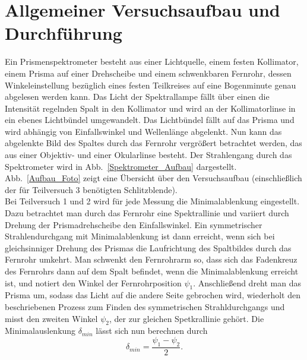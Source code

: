 \documentclass[12pt,a4paper]{article}
\begin{document}
\section{Allgemeiner Versuchsaufbau und Durchführung}
Ein Prismenspektrometer besteht aus einer Lichtquelle, einem festen Kollimator, einem Prisma auf einer Drehscheibe und einem schwenkbaren Fernrohr, dessen Winkeleinstellung bezüglich eines festen Teilkreises auf eine Bogenminute genau abgelesen werden kann. Das Licht der Spektrallampe fällt über einen die Intensität regelnden Spalt in den Kollimator und wird an der Kollimatorlinse in ein ebenes Lichtbündel umgewandelt. Das Lichtbündel fällt auf das Prisma und wird abhängig von Einfallswinkel und Wellenlänge abgelenkt. Nun kann das abgelenkte Bild des Spaltes durch das Fernrohr vergrößert betrachtet werden, das aus einer Objektiv- und einer Okularlinse besteht. Der Strahlengang durch das Spektrometer wird in Abb.~\ref{Spektrometer_Aufbau} dargestellt. Abb.~\ref{Aufbau_Foto} zeigt eine Übersicht über den Versuchsaufbau (einschließlich der für Teilversuch 3 benötigten Schlitzblende).\\
Bei Teilversuch 1 und 2 wird für jede Messung die Minimalablenkung eingestellt. Dazu betrachtet man durch das Fernrohr eine Spektrallinie und variiert durch Drehung der Prismadrehscheibe den Einfallswinkel. Ein symmetrischer Strahlendurchgang mit Minimalablenkung ist dann erreicht, wenn sich bei gleichsinniger Drehung des Prismas die Laufrichtung des Spaltbildes durch das Fernrohr umkehrt. Man schwenkt den Fernrohrarm so, dass sich das Fadenkreuz des Fernrohrs dann auf dem Spalt befindet, wenn die Minimalablenkung erreicht ist, und notiert den Winkel der Fernrohrposition $\psi_1$. Anschließend dreht man das Prisma um, sodass das Licht auf die andere Seite gebrochen wird, wiederholt den beschriebenen Prozess zum Finden des symmetrischen Strahldurchgangs und misst den zweiten Winkel $\psi_2$, der zur gleichen Spetkrallinie gehört. Die Minimalauslenkung $\delta_{min}$ lässt sich nun berechnen durch
\begin{equation}\label{eq:delmin_aus_psi}
\delta_{min}=\frac{\psi_1-\psi_2}{2}.
\end{equation}
\end{document}
